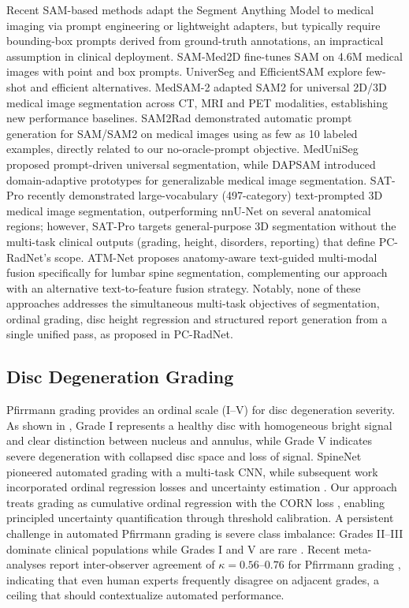\documentclass[journal]{IEEEtran}
\newcommand{\modelname}{PC-RadNet}
\begin{document}
Recent SAM-based methods \cite{ma2024medsam} adapt the Segment Anything Model to medical imaging via prompt engineering or lightweight adapters, but typically require bounding-box prompts derived from ground-truth annotations, an impractical assumption in clinical deployment.
SAM-Med2D \cite{cheng2023sammed2d} fine-tunes SAM on 4.6M medical images with point and box prompts.
UniverSeg \cite{butoi2023universeg} and EfficientSAM \cite{xiong2024efficientsam} explore few-shot and efficient alternatives.
MedSAM-2 \cite{medsam2_2024} adapted SAM2 for universal 2D/3D medical image segmentation across CT, MRI and PET modalities, establishing new performance baselines.
SAM2Rad \cite{sam2rad_2024} demonstrated automatic prompt generation for SAM/SAM2 on medical images using as few as 10 labeled examples, directly related to our no-oracle-prompt objective.
MedUniSeg \cite{meduniseg_2024} proposed prompt-driven universal segmentation, while DAPSAM \cite{dapsam_2025} introduced domain-adaptive prototypes for generalizable medical image segmentation.
SAT-Pro \cite{satpro2025} recently demonstrated large-vocabulary (497-category) text-prompted 3D medical image segmentation, outperforming nnU-Net on several anatomical regions; however, SAT-Pro targets general-purpose 3D segmentation without the multi-task clinical outputs (grading, height, disorders, reporting) that define \modelname{}'s scope.
ATM-Net \cite{atmnet2025} proposes anatomy-aware text-guided multi-modal fusion specifically for lumbar spine segmentation, complementing our approach with an alternative text-to-feature fusion strategy.
Notably, none of these approaches addresses the simultaneous multi-task objectives of segmentation, ordinal grading, disc height regression and structured report generation from a single unified pass, as proposed in \modelname{}.

\subsection{Disc Degeneration Grading}
Pfirrmann grading \cite{pfirrmann2001magnetic} provides an ordinal scale (I--V) for disc degeneration severity. As shown in , Grade I represents a healthy disc with homogeneous bright signal and clear distinction between nucleus and annulus, while Grade V indicates severe degeneration with collapsed disc space and loss of signal. SpineNet \cite{jamaludin2017spinenet} pioneered automated grading with a multi-task CNN, while subsequent work incorporated ordinal regression losses \cite{cao2020rank} and uncertainty estimation \cite{liawrungrueang2023discdegeneration}. Our approach treats grading as cumulative ordinal regression with the CORN loss \cite{shi2022corn}, enabling principled uncertainty quantification through threshold calibration. A persistent challenge in automated Pfirrmann grading is severe class imbalance: Grades II--III dominate clinical populations while Grades I and V are rare \cite{jamaludin2017spinenet}. Recent meta-analyses report inter-observer agreement of $\kappa = 0.56$--$0.76$ for Pfirrmann grading \cite{wilke2006discdegeneration}, indicating that even human experts frequently disagree on adjacent grades, a ceiling that should contextualize automated performance.
\end{document}
